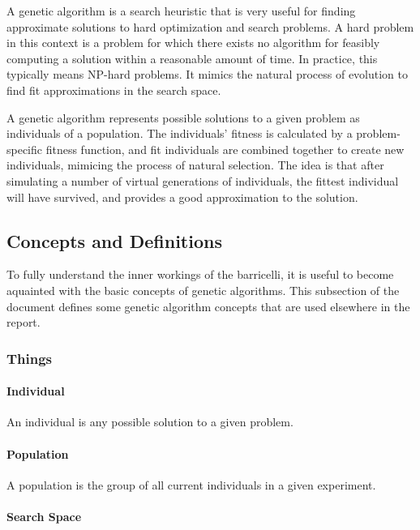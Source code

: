 A genetic algorithm is a search heuristic that is very useful for finding approximate solutions to hard optimization and search problems.
A hard problem in this context is a problem for which there exists no algorithm for feasibly computing a solution within a reasonable amount of time.
In practice, this typically means NP-hard problems.
It mimics the natural process of evolution to find fit approximations in the search space.

A genetic algorithm represents possible solutions to a given problem as individuals of a population.
The individuals' fitness is calculated by a problem-specific fitness function, and fit individuals are combined together to create new individuals, mimicing the process of natural selection.
The idea is that after simulating a number of virtual generations of individuals, the fittest individual will have survived, and provides a good approximation to the solution.

\subsection{Concepts and Definitions}

To fully understand the inner workings of the \Gls{barricelli}, it is useful to become aquainted with the basic concepts of genetic algorithms.
This subsection of the document defines some genetic algorithm concepts that are used elsewhere in the report.

\subsubsection{Things}

\paragraph{Individual}

An individual is any possible solution to a given problem.

\paragraph{Population}

A population is the group of all current individuals in a given experiment.

\paragraph{Search Space}

